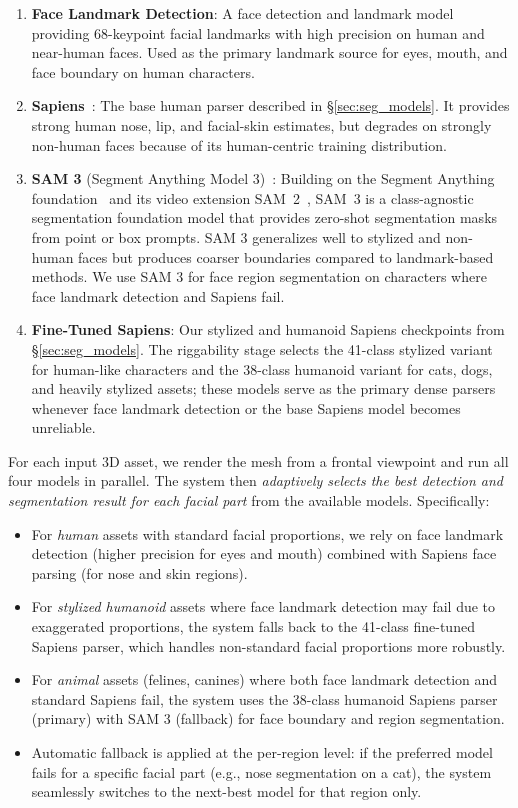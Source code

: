 \documentclass[acmtog,anonymous,review]{acmart}
\begin{document}
\begin{enumerate}
  \item \textbf{Face Landmark Detection}: A face detection and landmark model providing 68-keypoint facial landmarks with high precision on human and near-human faces. Used as the primary landmark source for eyes, mouth, and face boundary on human characters.
  \item \textbf{Sapiens}~\cite{khirodkar2025sapiens}: The base human parser described in \S\ref{sec:seg_models}. It provides strong human nose, lip, and facial-skin estimates, but degrades on strongly non-human faces because of its human-centric training distribution.
  \item \textbf{SAM 3} (Segment Anything Model 3)~\cite{carion2025sam3}: Building on the Segment Anything foundation~\cite{kirillov2023segment} and its video extension SAM~2~\cite{ravi2024sam2}, SAM~3 is a class-agnostic segmentation foundation model that provides zero-shot segmentation masks from point or box prompts. SAM 3 generalizes well to stylized and non-human faces but produces coarser boundaries compared to landmark-based methods. We use SAM 3 for face region segmentation on characters where face landmark detection and Sapiens fail.
  \item \textbf{Fine-Tuned Sapiens}: Our stylized and humanoid Sapiens checkpoints from \S\ref{sec:seg_models}. The riggability stage selects the 41-class stylized variant for human-like characters and the 38-class humanoid variant for cats, dogs, and heavily stylized assets; these models serve as the primary dense parsers whenever face landmark detection or the base Sapiens model becomes unreliable.
\end{enumerate}

For each input 3D asset, we render the mesh from a frontal viewpoint and run all four models in parallel. The system then \emph{adaptively selects the best detection and segmentation result for each facial part} from the available models. Specifically:
\begin{itemize}
  \item For \emph{human} assets with standard facial proportions, we rely on face landmark detection (higher precision for eyes and mouth) combined with Sapiens face parsing (for nose and skin regions).
  \item For \emph{stylized humanoid} assets where face landmark detection may fail due to exaggerated proportions, the system falls back to the 41-class fine-tuned Sapiens parser, which handles non-standard facial proportions more robustly.
  \item For \emph{animal} assets (felines, canines) where both face landmark detection and standard Sapiens fail, the system uses the 38-class humanoid Sapiens parser (primary) with SAM 3 (fallback) for face boundary and region segmentation.
  \item Automatic fallback is applied at the per-region level: if the preferred model fails for a specific facial part (e.g., nose segmentation on a cat), the system seamlessly switches to the next-best model for that region only.
\end{itemize}
\end{document}
